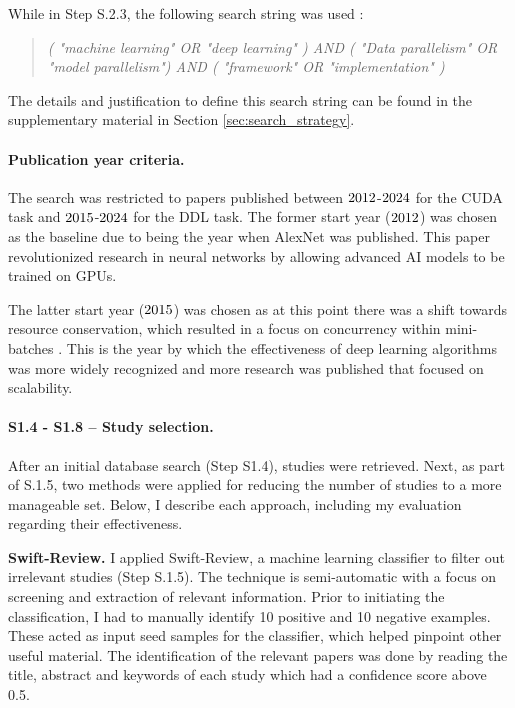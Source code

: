 While in Step S.2.3, the following search string was used :
\begin{quote}
	\textit{( "machine learning" OR "deep learning" )
		AND
		( "Data parallelism" OR "model parallelism")
		AND
		( "framework" OR "implementation" )}
\end{quote}

The details and justification to define this search string can be found in the supplementary
material in Section \ref{sec:search_strategy}.

\paragraph{Publication year criteria.}
The search was restricted to papers published between $2012$-$2024$ for the CUDA
task and $2015$-$2024$ for the DDL task. The former start year ($2012$)
was chosen as the baseline due to being the year when AlexNet \cite{krizhevsky_imagenet_2012} was
published. This paper revolutionized research in neural networks by allowing advanced AI models to
be trained on GPUs.

The latter start year ($2015$) was chosen as at this point there was a shift towards
resource conservation, which resulted in a focus on concurrency within mini-batches
\cite{ben-nun_demystifying_2020}. This is the year by which the effectiveness of deep learning
algorithms was more widely recognized and more research was published that focused on scalability.

\paragraph{S1.4 - S1.8 -- Study selection.}
After an initial database search (Step S1.4),  studies were retrieved. Next, as part
of S.1.5, two methods were applied for reducing the number of studies to a more manageable set.
Below, I describe each approach, including my evaluation regarding their effectiveness.

\textbf{Swift-Review.}
I applied Swift-Review\cite{Howard2016SWIFTReviewAT}, a machine learning classifier to filter out
irrelevant studies (Step S.1.5). The technique is semi-automatic
with a focus on screening and extraction of relevant information. Prior to initiating the classification,
I had to manually identify 10 positive and 10 negative examples. These
acted as input seed samples for the classifier, which helped pinpoint other useful material. The
identification of the relevant papers was done by reading the title, abstract and keywords of
each study which had a confidence score above 0.5.

